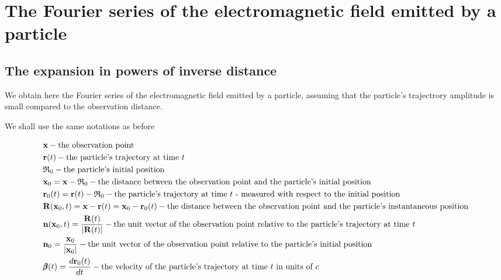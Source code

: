 \chapter{The Fourier series of the electromagnetic field emitted by a particle}


\section{The expansion in powers of inverse distance}
We obtain here the Fourier series of the electromagnetic field emitted by a particle, assuming that the particle's trajectrory amplitude is small compared to the observation distance.

We shall use the same notations as before
\begin{tcolorbox}[colback=blue!5!white,colframe=blue!75!black]
    \begin{align}
         & {\bf x} - \text{the observation point}                                                                                                                             \\
         & {\bf r}(t) - \text{the particle's trajectory at time $t$}                                                                                                          \\
         & {\mathfrak R}_0 - \text{the particle's initial position}                                                                                                           \\
         & {\bf x}_0 = {\bf x}-{\mathfrak R}_0 - \text{the distance between the observation point and the particle's initial position}                                        \\
         & {\bf r}_0(t) = {\bf r}(t) - {\mathfrak R}_0 - \text{the particle's trajectory at time $t$ - measured with respect to the initial position}                         \\
         & {\bf R}({\bf x}_0,t) = {\bf x}-{\bf r}(t) = {\bf x}_0 - {\bf r}_0(t) - \text{the distance between the observation point and the particle's instantaneous position} \\
         & {\bf n}({\bf x}_0,t) = \frac{{\bf R}(t)}{|{\bf R}(t)|} - \text{the unit vector of the observation point relative to the particle's trajectory at time $t$}         \\
         & {\bf n}_0 = \frac{{\bf x}_0}{|{\bf x}_0|} - \text{the unit vector of the observation point relative to the particle's initial position}                            \\
         & {\pmb \beta}(t) = \frac{d{\bf r}_0(t)}{dt} - \text{the velocity of the particle's trajectory at time $t$ in units of $c$}
    \end{align}
\end{tcolorbox}


